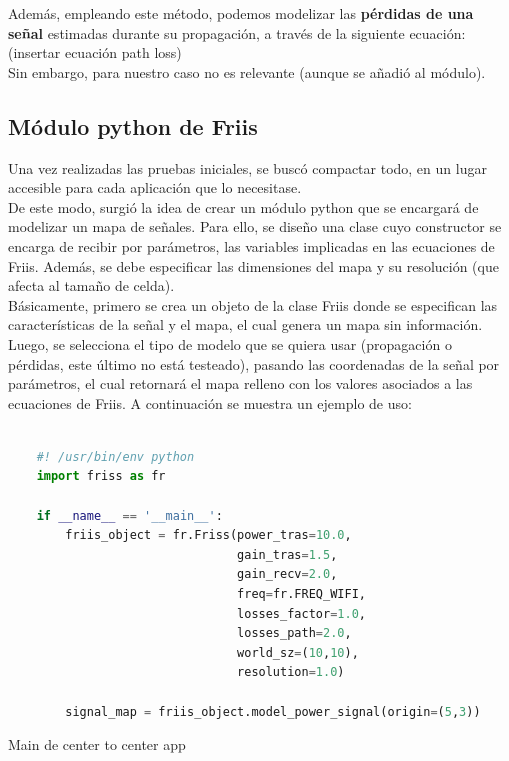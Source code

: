 Además, empleando este método, podemos modelizar las \textbf{pérdidas de una señal} estimadas durante su propagación, a través de la siguiente ecuación:\\

(insertar ecuación path loss)\\

Sin embargo, para nuestro caso no es relevante (aunque se añadió al módulo).\\

\subsection{Módulo python de Friis}
\label{subsec:friis-module}

Una vez realizadas las pruebas iniciales, se buscó compactar todo, en un lugar accesible para cada aplicación que lo necesitase.\\

De este modo, surgió la idea de crear un módulo python que se encargará de modelizar un mapa de señales. Para ello, se diseño una clase cuyo constructor se encarga de recibir por parámetros, las variables implicadas en las ecuaciones de Friis. Además, se debe especificar las dimensiones del mapa y su resolución (que afecta al tamaño de celda).\\

Básicamente, primero se crea un objeto de la clase Friis donde se especifican las características de la señal y el mapa, el cual genera un mapa sin información. Luego, se selecciona el tipo de modelo que se quiera usar (propagación o pérdidas, este último no está testeado), pasando las coordenadas de la señal por parámetros, el cual retornará el mapa relleno con los valores asociados a las ecuaciones de Friis. A continuación se muestra un ejemplo de uso:

\begin{code}[H]
    \begin{lstlisting}[language=Python]

    #! /usr/bin/env python    
    import friss as fr

    if __name__ == '__main__':
        friis_object = fr.Friss(power_tras=10.0, 
                                gain_tras=1.5, 
                                gain_recv=2.0,
                                freq=fr.FREQ_WIFI, 
                                losses_factor=1.0, 
                                losses_path=2.0,
                                world_sz=(10,10), 
                                resolution=1.0)

        signal_map = friis_object.model_power_signal(origin=(5,3))

\end{lstlisting}
\caption[Main de center to center app]{Main de center to center app}
\label{cod:c2c_app}
\end{code}

